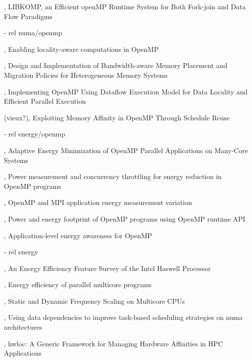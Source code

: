 \cite{Broquedis2012}, LIBKOMP, an Efficient openMP Runtime System for Both Fork-join and Data Flow Paradigms

  - rel numa/openmp

\cite{Huang2010}, Enabling locality-aware computations in OpenMP

\cite{Yu2017}, Design and Implementation of Bandwidth-aware Memory Placement and Migration Policies for Heterogeneous Memory Systems

\cite{Weng2002}, Implementing OpenMP Using Dataflow Execution Model for Data Locality and Efficient Parallel Execution

(vieux?)\cite{Nikolopoulos2001}, Exploiting Memory Affinity in OpenMP Through Schedule Reuse

  - rel energy/openmp

\cite{Shafik2015}, Adaptive Energy Minimization of OpenMP Parallel Applications on Many-Core Systems

\cite{Porterfield2013}, Power measurement and concurrency throttling for energy reduction in OpenMP programs

\cite{Porterfield2013a}, OpenMP and MPI application energy measurement variation

\cite{Nandamuri2015}, Power and energy footprint of OpenMP programs using OpenMP runtime API

\cite{Alessi2015}, Application-level energy awareness for OpenMP

  - rel energy

\cite{Hackenberg2015}, An Energy Efficiency Feature Survey of the Intel Haswell Processor

\cite{Davidovic2015}, Energy efficiency of parallel multicore programs

\cite{Bao2016}, Static and Dynamic Frequency Scaling on Multicore CPUs






%
\cite{Virouleau2016b}, Using data dependencies to improve task-based scheduling strategies on numa architectures

\cite{Broquedis2010}, hwloc: {A} Generic Framework for Managing Hardware Affinities in {HPC} Applications


